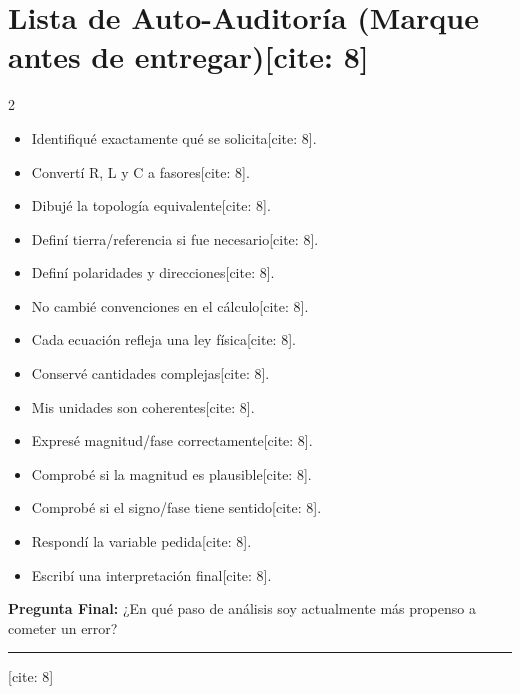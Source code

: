 \documentclass[11pt, a4paper]{article}
\begin{document}
\section*{Lista de Auto-Auditoría (Marque antes de entregar)[cite: 8]}
\begin{tcolorbox}[colback=white, colframe=ucbblue]
    \begin{multicols}{2}
    \begin{itemize}
        \setlength{\itemsep}{2pt}
        \item[$\square$] Identifiqué exactamente qué se solicita[cite: 8].
        \item[$\square$] Convertí R, L y C a fasores[cite: 8].
        \item[$\square$] Dibujé la topología equivalente[cite: 8].
        \item[$\square$] Definí tierra/referencia si fue necesario[cite: 8].
        \item[$\square$] Definí polaridades y direcciones[cite: 8].
        \item[$\square$] No cambié convenciones en el cálculo[cite: 8].
        \item[$\square$] Cada ecuación refleja una ley física[cite: 8].
        \item[$\square$] Conservé cantidades complejas[cite: 8].
        \item[$\square$] Mis unidades son coherentes[cite: 8].
        \item[$\square$] Expresé magnitud/fase correctamente[cite: 8].
        \item[$\square$] Comprobé si la magnitud es plausible[cite: 8].
        \item[$\square$] Comprobé si el signo/fase tiene sentido[cite: 8].
        \item[$\square$] Respondí la variable pedida[cite: 8].
        \item[$\square$] Escribí una interpretación final[cite: 8].
    \end{itemize}
    \end{multicols}
\end{tcolorbox}
\textbf{Pregunta Final:} ¿En qué paso de análisis soy actualmente más propenso a cometer un error? \rule{4cm}{0.4pt}[cite: 8]
\end{document}
